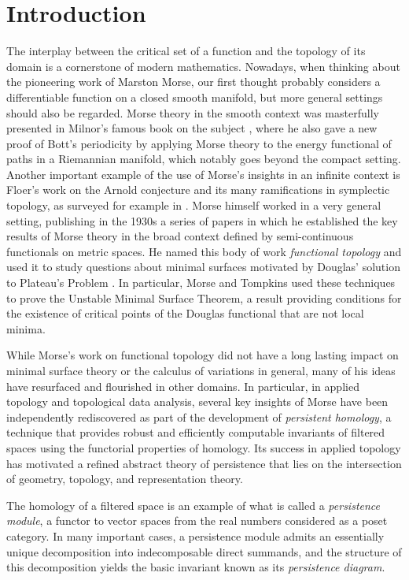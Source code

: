 
\section{Introduction}

The interplay between the critical set of a function and the topology of its domain is a cornerstone of modern mathematics.
Nowadays, when thinking about the pioneering work of Marston Morse, our first thought probably considers a differentiable function on a closed smooth manifold, but more general settings should also be regarded.
Morse theory in the smooth context was masterfully presented in Milnor's famous book on the subject \cite{MR0163331}, where he also gave a new proof of Bott's periodicity by applying Morse theory to the energy functional of paths in a Riemannian manifold, which notably goes beyond the compact setting.
Another important example of the use of Morse's insights in an infinite context is Floer's work on the Arnold conjecture and its many ramifications in symplectic topology, as surveyed for example in \cite{MR1702944}.
Morse himself worked in a very general setting, publishing in the 1930s a series of papers \cite{Morse.1937, Morse.1938, Morse.1940, MR9102} in which he established the key results of Morse theory in the broad context defined by semi-continuous functionals on metric spaces.
He named this body of work \emph{functional topology} and used it to study questions about minimal surfaces motivated by Douglas' solution to Plateau’s Problem \cite{Douglas.1931}.
In particular, Morse and Tompkins \cite{Morse.1939, Morse.1941} used these techniques to prove the Unstable Minimal Surface Theorem, a result providing conditions for the existence of critical points of the Douglas functional that are not local minima.

While Morse's work on functional topology did not have a long lasting impact on minimal surface theory or the calculus of variations in general, many of his ideas have resurfaced and flourished in other domains.
In particular, in applied topology and topological data analysis, several key insights of Morse have been independently rediscovered as part of the development of \textit{persistent homology}, a technique that provides robust and efficiently computable invariants of filtered spaces using the functorial properties of homology.
Its success in applied topology has motivated a refined abstract theory of persistence that lies on the intersection of geometry, topology, and representation theory.

The homology of a filtered space is an example of what is called a \textit{persistence module}, a functor to vector spaces from the real numbers considered as a poset category.
In many important cases, a persistence module admits an essentially unique decomposition into indecomposable direct summands, and the structure of this decomposition yields the basic invariant known as its \textit{persistence diagram}.


